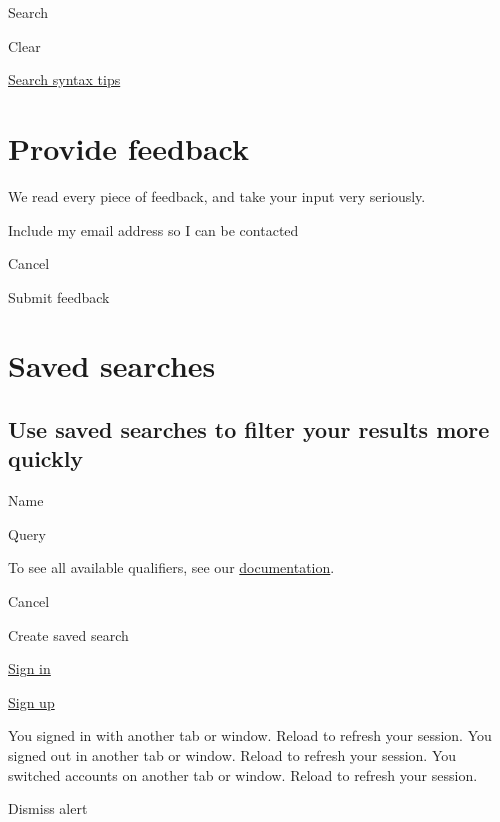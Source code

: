 \documentclass[
  letterpaper,
]{book}
\begin{document}
Search

Clear

\href{https://docs.github.com/search-github/github-code-search/understanding-github-code-search-syntax}{Search
syntax tips}


\chapter{Provide feedback}\label{provide-feedback}

We read every piece of feedback, and take your input very seriously.

Include my email address so I can be contacted

Cancel

Submit feedback


\chapter{Saved searches}\label{saved-searches}

\section{Use saved searches to filter your results more
quickly}\label{use-saved-searches-to-filter-your-results-more-quickly}

Name

Query

To see all available qualifiers, see our
\href{https://docs.github.com/search-github/github-code-search/understanding-github-code-search-syntax}{documentation}.

Cancel

Create saved search

\href{./login?return_to=https\%3A\%2F\%2Fgithub.com\%2Fshionkim\%2FCPS-Demo\%2Fblob\%2Fmain\%2Ftext\%2Forpheus.html}{Sign
in}

\href{./signup?ref_cta=Sign+up&ref_loc=header+logged+out&ref_page=\%2F\%3Cuser-name\%3E\%2F\%3Crepo-name\%3E\%2Fblob\%2Fshow&source=header-repo&source_repo=shionkim\%2FCPS-Demo}{Sign
up}

You signed in with another tab or window. Reload to refresh your
session. You signed out in another tab or window. Reload to refresh your
session. You switched accounts on another tab or window. Reload to
refresh your session.

Dismiss alert
\end{document}
